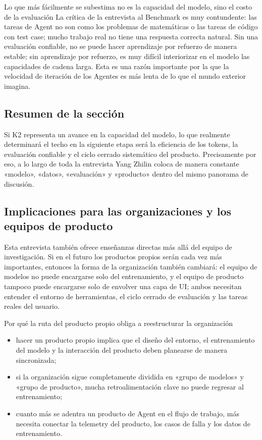 \documentclass[a4paper]{article}
\begin{document}
\begin{warningbox}{Lo que más fácilmente se subestima no es la capacidad del modelo, sino el costo de la evaluación}
La crítica de la entrevista al Benchmark es muy contundente: las tareas de Agent no son como los problemas de matemáticas o las tareas de código con test case; mucho trabajo real no tiene una respuesta correcta natural. Sin una evaluación confiable, no se puede hacer aprendizaje por refuerzo de manera estable; sin aprendizaje por refuerzo, es muy difícil interiorizar en el modelo las capacidades de cadena larga. Esta es una razón importante por la que la velocidad de iteración de los Agentes es más lenta de lo que el mundo exterior imagina.
\end{warningbox}

\subsection{Resumen de la sección}
Si K2 representa un avance en la capacidad del modelo, lo que realmente determinará el techo en la siguiente etapa será la eficiencia de los tokens, la evaluación confiable y el ciclo cerrado sistemático del producto. Precisamente por eso, a lo largo de toda la entrevista Yang Zhilin coloca de manera constante «modelo», «datos», «evaluación» y «producto» dentro del mismo panorama de discusión.

\subsection{Implicaciones para las organizaciones y los equipos de producto}
Esta entrevista también ofrece enseñanzas directas más allá del equipo de investigación. Si en el futuro los productos propios serán cada vez más importantes, entonces la forma de la organización también cambiará: el equipo de modelos no puede encargarse solo del entrenamiento, y el equipo de producto tampoco puede encargarse solo de envolver una capa de UI; ambos necesitan entender el entorno de herramientas, el ciclo cerrado de evaluación y las tareas reales del usuario.

\begin{knowledgebox}{Por qué la ruta del producto propio obliga a reestructurar la organización}
\begin{itemize}
    \item hacer un producto propio implica que el diseño del entorno, el entrenamiento del modelo y la interacción del producto deben planearse de manera sincronizada;
    \item si la organización sigue completamente dividida en «grupo de modelos» y «grupo de producto», mucha retroalimentación clave no puede regresar al entrenamiento;
    \item cuanto más se adentra un producto de Agent en el flujo de trabajo, más necesita conectar la telemetry del producto, los casos de falla y los datos de entrenamiento.
\end{itemize}
\end{knowledgebox}
\end{document}
